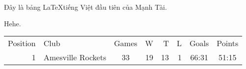 \documentclass[11pt]{article}
\begin{document}
Đây là bảng \LaTeX tiếng Việt đầu tiên của Mạnh Tài.

Hehe.

\begin{tabular}{r|l||c|rrr|c|c}
Position & Club & Games & W & T & L & Goals & Points \\
1 & Amesville Rockets & 33 & 19 & 13 & 1 & 66:31 & 51:15 \\
\end{tabular}
\end{document}
